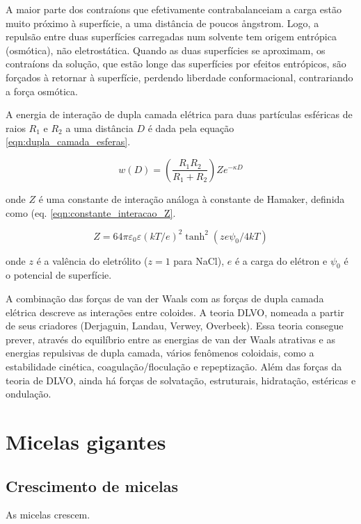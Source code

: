 	A maior parte dos contraíons que efetivamente contrabalanceiam a carga estão muito próximo à superfície, a uma distância de poucos \aa ngstrom. Logo, a repulsão entre duas superfícies carregadas num solvente tem origem entrópica (osmótica), não eletrostática. Quando as duas superfícies se aproximam, os contraíons da solução, que estão longe das superfícies por efeitos entrópicos, são forçados à retornar à superfície, perdendo liberdade conformacional, contrariando a força osmótica.
	
	A energia de interação de dupla camada elétrica para duas partículas esféricas de raios \(R_1\) e \(R_2\) a uma distância \(D\) é dada pela equação \ref{eqn:dupla_camada_esferas}.
	
	\begin{equation}
		w(D) = \left(  \dfrac{R_1R_2}{R_1+R_2}  \right)Ze^{-\kappa D}
		\label{eqn:dupla_camada_esferas}
	\end{equation}
	
	\noindent onde \(Z\) é uma constante de interação análoga à constante de Hamaker, definida como (eq. \ref{eqn:constante_interacao_Z}.
	
	\begin{equation}
		Z = 64 \pi \varepsilon _ { 0 } \varepsilon ( k T / e ) ^ { 2 } \tanh ^ { 2 } \left( z e \psi _ { 0 } / 4 k T \right)
		\label{eqn:constante_interacao_Z}
	\end{equation}
	
	\noindent onde \(z\) é a valência do eletrólito (\(z=1\) para NaCl), \(e\) é a carga do elétron e \(\psi_0\) é o potencial de superfície.
	
	A combinação das forças de van der Waals com as forças de dupla camada elétrica descreve as interações entre coloides. A teoria DLVO, nomeada a partir de seus criadores (Derjaguin, Landau, Verwey, Overbeek). Essa teoria consegue prever, através do equilíbrio entre as energias de van der Waals atrativas e as energias repulsivas de dupla camada, vários fenômenos coloidais, como a estabilidade cinética, coagulação/floculação e repeptização. Além das forças da teoria de DLVO, ainda há forças de solvatação, estruturais, hidratação, estéricas e ondulação.
	

	\chapter{Micelas gigantes}
		\label{chap:micelas_gigantes}
		\section{Crescimento de micelas}
		As micelas crescem.
